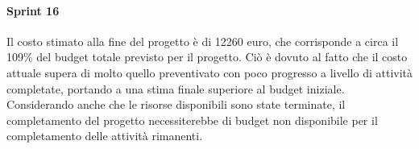 \paragraph{Sprint 16}
Il costo stimato alla fine del progetto è di 12260 euro, che corrisponde a circa il 109\% del budget totale previsto per il progetto.
Ciò è dovuto al fatto che il costo attuale supera di molto quello preventivato con poco progresso a livello di attività completate, portando a una stima finale superiore al budget iniziale.
Considerando anche che le risorse disponibili sono state terminate, il completamento del progetto necessiterebbe di budget non disponibile per il completamento delle attività rimanenti.